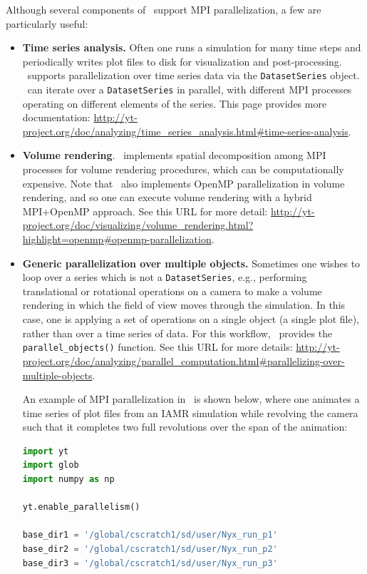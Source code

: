 Although several components of \yt\ support MPI parallelization, a few are particularly useful:
\begin{itemize}
  \item \textbf{Time series analysis.} Often one runs a simulation for many
time steps and periodically writes plot files to disk for visualization and
post-processing. \yt\ supports parallelization over time series data via the
\texttt{DatasetSeries} object. \yt\ can iterate over a \texttt{DatasetSeries}
in parallel, with different MPI processes operating on different elements of
the series. This page provides more documentation:
\url{http://yt-project.org/doc/analyzing/time_series_analysis.html#time-series-analysis}.

  \item \textbf{Volume rendering}. \yt\ implements spatial decomposition among
MPI processes for volume rendering procedures, which can be computationally
expensive. Note that \yt\ also implements OpenMP parallelization in volume
rendering, and so one can execute volume rendering with a hybrid MPI+OpenMP
approach. See this URL for more detail:
\url{http://yt-project.org/doc/visualizing/volume_rendering.html?highlight=openmp#openmp-parallelization}.

  \item \textbf{Generic parallelization over multiple objects.} Sometimes one
wishes to loop over a series which is not a \texttt{DatasetSeries}, e.g.,
performing translational or rotational operations on a camera to make a volume
rendering in which the field of view moves through the simulation. In this
case, one is applying a set of operations on a single object (a single plot
file), rather than over a time series of data. For this workflow, \yt\ provides
the \texttt{parallel\_objects()} function. See this URL for more details:
\url{http://yt-project.org/doc/analyzing/parallel_computation.html#parallelizing-over-multiple-objects}.

An example of MPI parallelization in \yt\ is shown below, where one animates a
time series of plot files from an IAMR simulation while revolving the camera
such that it completes two full revolutions over the span of the animation:

\begin{lstlisting}[language=python,breaklines=true]
import yt
import glob
import numpy as np

yt.enable_parallelism()

base_dir1 = '/global/cscratch1/sd/user/Nyx_run_p1'
base_dir2 = '/global/cscratch1/sd/user/Nyx_run_p2'
base_dir3 = '/global/cscratch1/sd/user/Nyx_run_p3'


\end{lstlisting}
\end{itemize}

